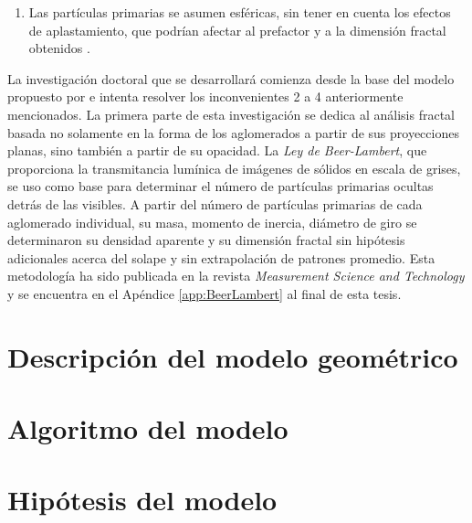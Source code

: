 \begin{enumerate}
\item Las partículas primarias se asumen esféricas, sin tener en cuenta los efectos de aplastamiento, que podrían afectar al prefactor y a la dimensión fractal obtenidos \cite{ohetal:1997,brasiletal:1999,alzaitoneetal:2009}.
\end{enumerate}

\par La investigación doctoral que se desarrollará comienza desde la base del modelo propuesto por \cite{lapuertaetal:2006} e intenta resolver los inconvenientes 2 a 4 anteriormente mencionados. La primera parte de esta investigación se dedica al análisis fractal  basada no solamente en la forma de los aglomerados a partir de sus proyecciones planas, sino también a partir de su opacidad. La \emph{Ley de Beer-Lambert}, que proporciona la transmitancia lumínica de imágenes de sólidos en escala de grises, se uso como base para determinar el número de partículas primarias ocultas detrás de las visibles. A partir del número de partículas primarias de cada aglomerado individual, su masa, momento de inercia, diámetro de giro se determinaron su densidad aparente y su dimensión fractal sin hipótesis adicionales acerca del solape y sin extrapolación de patrones promedio. Esta metodología ha sido publicada en la revista \textit{Measurement Science and Technology} y se encuentra en el Apéndice \ref{app:BeerLambert} al final de esta tesis.

\section{Descripción del modelo geométrico}
\section{Algoritmo del modelo}
\section{Hipótesis del modelo}


\newpage
		
